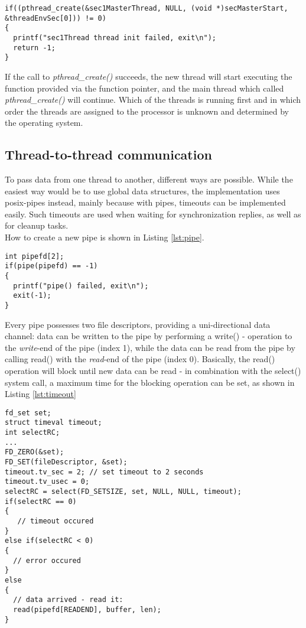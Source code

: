 \begin{lstlisting}[style=cStyle,caption={Creating a new thread},label=lst:pthread_create]
if((pthread_create(&sec1MasterThread, NULL, (void *)secMasterStart, &threadEnvSec[0])) != 0)
{
  printf("sec1Thread thread init failed, exit\n");
  return -1;
}
\end{lstlisting}
If the call to \textit{pthread\_create()} succeeds, the new thread will start executing the function provided via the function pointer, and the main thread which called 
\textit{pthread\_create()} will continue. Which of the threads is running first and in which order the threads are assigned to the processor is unknown and determined by the operating
system.

\subsection{Thread-to-thread communication}
To pass data from one thread to another, different ways are possible. While the easiest way would be to use global data structures, the implementation uses 
\gls{posix}-pipes instead, mainly because with pipes, timeouts can be implemented easily. Such timeouts are used when waiting for synchronization replies, as well as for 
cleanup tasks.
\\
How to create a new pipe is shown in Listing \ref{lst:pipe}.
\begin{lstlisting}[style=cStyle, caption={Creating a pipe},label=lst:pipe]
int pipefd[2];
if(pipe(pipefd) == -1)
{
  printf("pipe() failed, exit\n");
  exit(-1);
}
\end{lstlisting}
Every pipe possesses two file descriptors, providing a uni-directional data channel: data can be written to the pipe by performing a write() - operation to the \textit{write}-end of the
pipe (index 1), while the data can be read from the pipe by calling read() with the \textit{read}-end of the pipe (index 0). Basically, the read() operation will block until new data can be read - in 
combination with the select() system call, a maximum time for the blocking operation can be set, as shown in Listing \ref{lst:timeout}
\begin{lstlisting}[style=cStyle,caption={Blocking read with timeout},label=lst:timeout]
fd_set set;
struct timeval timeout;
int selectRC;
...
FD_ZERO(&set);
FD_SET(fileDescriptor, &set);
timeout.tv_sec = 2;	// set timeout to 2 seconds
timeout.tv_usec = 0;
selectRC = select(FD_SETSIZE, set, NULL, NULL, timeout);
if(selectRC == 0)
{
   // timeout occured
}
else if(selectRC < 0)
{
  // error occured
}
else
{
  // data arrived - read it:
  read(pipefd[READEND], buffer, len);
}
\end{lstlisting}
